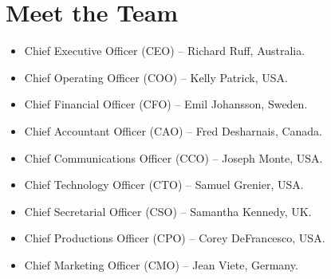 \documentclass[12pt,a4paper]{article}
\begin{document}
  \section*{Meet the Team}
  \begin{itemize}
    \item{Chief Executive Officer (CEO) – Richard Ruff, Australia.}
    \item{Chief Operating Officer (COO) – Kelly Patrick, USA.}
    \item{Chief Financial Officer (CFO) – Emil Johansson, Sweden.}
    \item{Chief Accountant Officer (CAO) – Fred Desharnais, Canada.}
    \item{Chief Communications Officer (CCO) – Joseph Monte, USA.}
    \item{Chief Technology Officer (CTO) – Samuel Grenier, USA.}
    \item{Chief Secretarial Officer (CSO) – Samantha Kennedy, UK.}
    \item{Chief Productions Officer (CPO) – Corey DeFrancesco, USA.}
    \item{Chief Marketing Officer (CMO) – Jean Viete, Germany.}
  \end{itemize}
  \printbibliography{}
\end{document}
